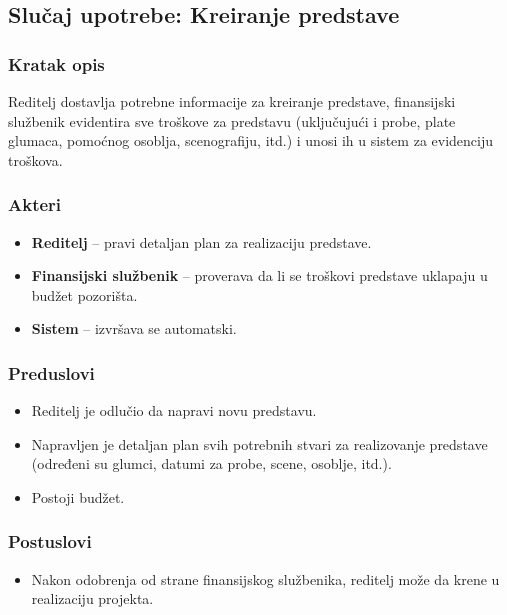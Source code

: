 \subsection{Slučaj upotrebe: Kreiranje predstave}

\subsubsection*{Kratak opis}

Reditelj dostavlja potrebne informacije za kreiranje predstave,
finansijski službenik evidentira sve troškove za predstavu (uključujući
i probe, plate glumaca, pomoćnog osoblja, scenografiju, itd.) i unosi ih
u sistem za evidenciju troškova.

\subsubsection*{Akteri}
\begin{itemize}
    \item \textbf{Reditelj} -- pravi detaljan plan za realizaciju predstave.
    \item \textbf{Finansijski službenik} -- proverava da li se troškovi predstave uklapaju u budžet pozorišta.
    \item \textbf{Sistem} -- izvršava se automatski.
\end{itemize}

\subsubsection*{Preduslovi}
\begin{itemize}
    \item Reditelj je odlučio da napravi novu predstavu.
    \item Napravljen je detaljan plan svih potrebnih stvari za realizovanje predstave (određeni su glumci, datumi za probe, scene, osoblje, itd.).
    \item Postoji budžet.
\end{itemize}

\subsubsection*{Postuslovi}
\begin{itemize}
    \item Nakon odobrenja od strane finansijskog službenika, reditelj može da krene u realizaciju projekta.
\end{itemize}

